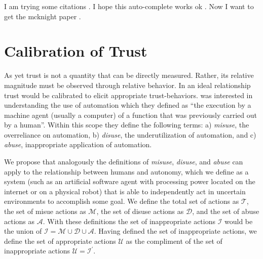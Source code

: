     I am trying some citations \cite{Rasmussen2006-ne}. I hope this auto-complete works ok \cite{Snoek2012-tt}. Now I want to get the mcknight paper \cite{D_Harrison_McKnight2001-fa}.

\section{Calibration of Trust}
    As yet trust is not a quantity that can be directly measured. Rather, its relative magnitude must be observed through relative behavior. In an ideal relationship trust would be calibrated to elicit appropriate trust-behaviors. \cite{Parasuraman1997-co} was interested in understanding the use of automation which they defined as ``the execution by a machine agent (usually a computer) of a function that was previously carried out by a human''. Within this scope they define the following terms: a) \emph{misuse}, the overreliance on automation, b) \emph{disuse}, the underutilization of automation, and c) \emph{abuse}, inappropriate application of automation.

    We propose that analogously the definitions of \emph{misuse}, \emph{disuse}, and \emph{abuse} can apply to the relationship between humans and autonomy, which we define as a system (such as an artificial software agent with processing power located on the internet or on a physical robot) that is able to independently act in uncertain environments to accomplish some goal. We define the total set of actions as $\mathcal{T}$, the set of misue actions as $\mathcal{M}$, the set of disuse actions as $\mathcal{D}$, and the set of abuse actions as $\mathcal{A}$. With these definitions the set of inappropriate actions $\mathcal{I}$ would be the union of $\mathcal{I} = \mathcal{M}\cup\mathcal{D}\cup\mathcal{A}$. Having defined the set of inappropriate actions, we define the set of appropriate actions $\mathcal{U}$ as the compliment of the set of inappropriate actions $\mathcal{U} = \mathcal{I}^\prime$.
    

